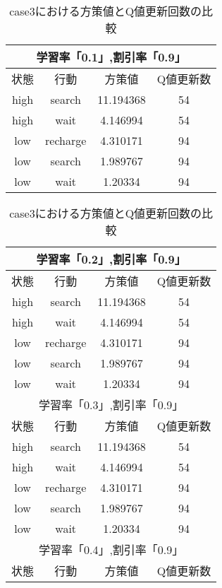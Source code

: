 \begin{table}
  \centering
  \caption{case3における方策値とQ値更新回数の比較}
  \label{table:6}
  \begin{minipage}[c]{\hsize}
    \centering
    \begin{tabular}{|c|c|c|c|}
      \hline
      \multicolumn{4}{|c|}{学習率「0.1」,割引率「0.9」} \\
      \hline
      状態 & 行動 & 方策値 & Q値更新数\\
      \hline
      high & search & 11.194368 & 54 \\
      high & wait & 4.146994 & 54 \\
      low & recharge & 4.310171 & 94 \\
      low & search & 1.989767 & 94 \\
      low & wait & 1.20334 & 94 \\
      \hline
    \end{tabular}
  \end{minipage}
  \begin{minipage}[t]{0.45\hsize}
    \begin{tabular}{|c|c|c|c|}
      \hline
      \multicolumn{4}{|c|}{学習率「0.2」,割引率「0.9」} \\
      \hline
      状態 & 行動 & 方策値 & Q値更新数\\
      \hline
      high & search & 11.194368 & 54 \\
      high & wait & 4.146994 & 54 \\
      low & recharge & 4.310171 & 94 \\
      low & search & 1.989767 & 94 \\
      low & wait & 1.20334 & 94 \\
      \hline\hline
      \multicolumn{4}{|c|}{学習率「0.3」,割引率「0.9」} \\
      \hline
      状態 & 行動 & 方策値 & Q値更新数\\
      \hline
      high & search & 11.194368 & 54 \\
      high & wait & 4.146994 & 54 \\
      low & recharge & 4.310171 & 94 \\
      low & search & 1.989767 & 94 \\
      low & wait & 1.20334 & 94 \\
      \hline\hline
      \multicolumn{4}{|c|}{学習率「0.4」,割引率「0.9」} \\
      \hline
      状態 & 行動 & 方策値 & Q値更新数\\

\end{tabular}
\end{minipage}
\end{table}
